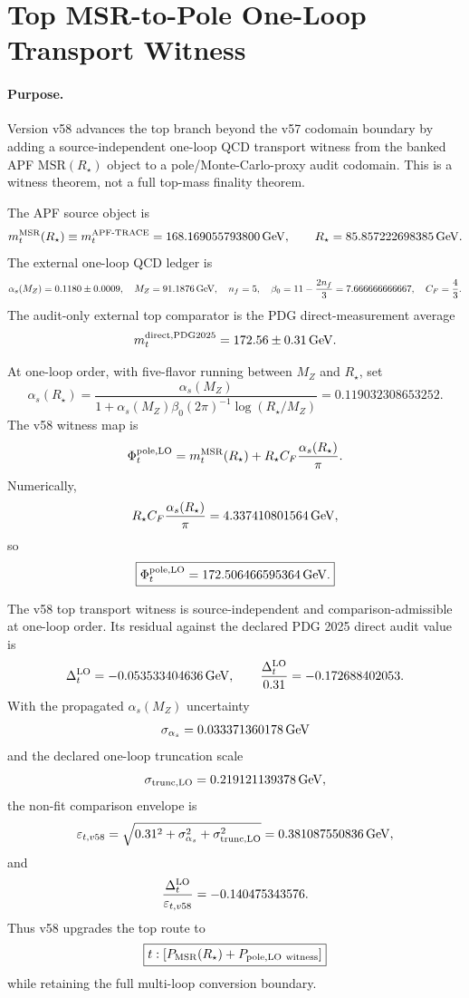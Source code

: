 \section{Top MSR-to-Pole One-Loop Transport Witness}
\label{sec:top-msr-to-pole-lo-transport-v58}

\paragraph{Purpose.}
Version v58 advances the top branch beyond the v57 codomain boundary by adding a
source-independent one-loop QCD transport witness from the banked APF
\(\mathrm{MSR}(R_\star)\) object to a pole/Monte-Carlo-proxy audit codomain.
This is a witness theorem, not a full top-mass finality theorem.

\begin{definition}
The APF source object is
\[
 m_t^{\rm MSR}(R_\star) \equiv m_t^{\rm APF\text{-}TRACE}
 =168.169055793800\,{\rm GeV},
 \qquad
 R_\star=85.857222698385\,{\rm GeV}.
\]
The external one-loop QCD ledger is
\[
 \alpha_s(M_Z)=0.1180\pm 0.0009,\quad
 M_Z=91.1876\,{\rm GeV},\quad
 n_f=5,\quad
 \beta_0=11-\frac{2n_f}{3}=7.666666666667,\quad
 C_F=\frac43.
\]
The audit-only external top comparator is the PDG direct-measurement average
\[
 m_t^{\rm direct,PDG2025}=172.56\pm 0.31\,{\rm GeV}.
\]
\end{definition}

\begin{definition}
At one-loop order, with five-flavor running between \(M_Z\) and \(R_\star\), set
\[
 \alpha_s(R_\star)
 =\frac{\alpha_s(M_Z)}{1+\alpha_s(M_Z)\beta_0(2\pi)^{-1}
 \log(R_\star/M_Z)}
 =0.119032308653252.
\]
The v58 witness map is
\[
 \Phi_t^{\rm pole,LO}
 =m_t^{\rm MSR}(R_\star)+R_\star C_F\frac{\alpha_s(R_\star)}{\pi}.
\]
Numerically,
\[
 R_\star C_F\frac{\alpha_s(R_\star)}{\pi}
 =4.337410801564\,{\rm GeV},
\]
so
\[
 \boxed{\Phi_t^{\rm pole,LO}=172.506466595364\,{\rm GeV}.}
\]
\end{definition}

\begin{theorem}
The v58 top transport witness is source-independent and comparison-admissible at
one-loop order.  Its residual against the declared PDG 2025 direct audit value is
\[
 \Delta_t^{\rm LO}=-0.053533404636\,{\rm GeV},\qquad
 \frac{\Delta_t^{\rm LO}}{0.31}=-0.172688402053.
\]
With the propagated \(\alpha_s(M_Z)\) uncertainty
\[
 \sigma_{\alpha_s}=0.033371360178\,{\rm GeV}
\]
and the declared one-loop truncation scale
\[
 \sigma_{\rm trunc,LO}=0.219121139378\,{\rm GeV},
\]
the non-fit comparison envelope is
\[
 \varepsilon_{t,v58}
 =\sqrt{0.31^2+\sigma_{\alpha_s}^2+\sigma_{\rm trunc,LO}^2}
 =0.381087550836\,{\rm GeV},
\]
and
\[
 \frac{\Delta_t^{\rm LO}}{\varepsilon_{t,v58}}
 =-0.140475343576.
\]
Thus v58 upgrades the top route to
\[
 \boxed{t:[P_{\rm MSR}(R_\star)+P_{\rm pole,LO\ witness}]}
\]
while retaining the full multi-loop conversion boundary.
\end{theorem}

